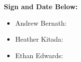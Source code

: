 \documentclass[12pt]{article}
\begin{document}
\textbf{Sign and Date Below: }
\begin{itemize}
\item Andrew Bernath: 

\item Heather Kitada: 

\item Ethan Edwards: 

\end{itemize}








\end{document}
